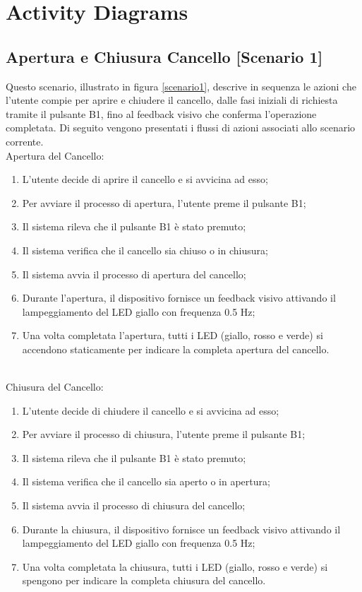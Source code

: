 \chapter{\bf{Activity Diagrams}}

\section{Apertura e Chiusura Cancello [Scenario 1]}
Questo scenario, illustrato in figura \ref{scenario1}, descrive in sequenza le azioni che l’utente compie per aprire e chiudere il cancello, dalle fasi iniziali di richiesta tramite il pulsante B1, fino al feedback visivo che conferma l'operazione completata.
Di seguito vengono presentati i flussi di azioni associati allo scenario corrente. \\

\noindent Apertura del Cancello:
\begin{enumerate}
    \item L’utente decide di aprire il cancello e si avvicina ad esso;
    \item Per avviare il processo di apertura, l’utente preme il pulsante B1;
    \item Il sistema rileva che il pulsante B1 è stato premuto;
    \item Il sistema verifica che il cancello sia chiuso o in chiusura;
    \item Il sistema avvia il processo di apertura del cancello;
    \item Durante l'apertura, il dispositivo fornisce un feedback visivo attivando il lampeggiamento del LED giallo con frequenza 0.5 Hz;
    \item Una volta completata l'apertura, tutti i LED (giallo, rosso e verde) si accendono staticamente per indicare la completa apertura del cancello.
\end{enumerate}

\noindent \\ Chiusura del Cancello:
\begin{enumerate}
    \item L’utente decide di chiudere il cancello e si avvicina ad esso;
    \item Per avviare il processo di chiusura, l’utente preme il pulsante B1;
    \item Il sistema rileva che il pulsante B1 è stato premuto;
    \item Il sistema verifica che il cancello sia aperto o in apertura;
    \item Il sistema avvia il processo di chiusura del cancello;
    \item Durante la chiusura, il dispositivo fornisce un feedback visivo attivando il lampeggiamento del LED giallo con frequenza 0.5 Hz;
    \item Una volta completata la chiusura, tutti i LED (giallo, rosso e verde) si spengono per indicare la completa chiusura del cancello.
\end{enumerate}


